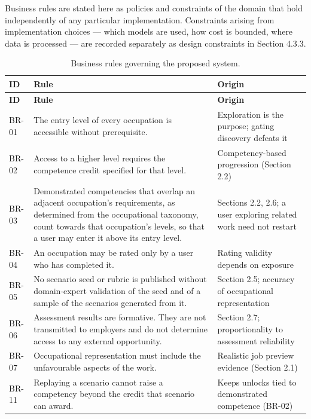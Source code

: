 Business rules are stated here as policies and constraints of the domain that hold independently of any particular implementation. Constraints arising from implementation choices --- which models are used, how cost is bounded, where data is processed --- are recorded separately as design constraints in Section 4.3.3.

{\small
\begin{longtable}{|>{\raggedright\arraybackslash}p{}|>{\raggedright\arraybackslash}p{}|>{\raggedright\arraybackslash}p{}|}
\caption{Business rules governing the proposed system.} \\
\hline
\textbf{ID} & \textbf{Rule} & \textbf{Origin} \\ \hline
\endfirsthead
\hline
\textbf{ID} & \textbf{Rule} & \textbf{Origin} \\ \hline
\endhead
BR-01 & The entry level of every occupation is accessible without prerequisite. & Exploration is the purpose; gating discovery defeats it \\ \hline
BR-02 & Access to a higher level requires the competence credit specified for that level. & Competency-based progression (Section 2.2) \\ \hline
BR-03 & Demonstrated competencies that overlap an adjacent occupation's requirements, as determined from the occupational taxonomy, count towards that occupation's levels, so that a user may enter it above its entry level. & Sections 2.2, 2.6; a user exploring related work need not restart \\ \hline
BR-04 & An occupation may be rated only by a user who has completed it. & Rating validity depends on exposure \\ \hline
BR-05 & No scenario seed or rubric is published without domain-expert validation of the seed and of a sample of the scenarios generated from it. & Section 2.5; accuracy of occupational representation \\ \hline
BR-06 & Assessment results are formative. They are not transmitted to employers and do not determine access to any external opportunity. & Section 2.7; proportionality to assessment reliability \\ \hline
BR-07 & Occupational representation must include the unfavourable aspects of the work. & Realistic job preview evidence (Section 2.1) \\ \hline
BR-11 & Replaying a scenario cannot raise a competency beyond the credit that scenario can award. & Keeps unlocks tied to demonstrated competence (BR-02) \\ \hline

\end{longtable}}

